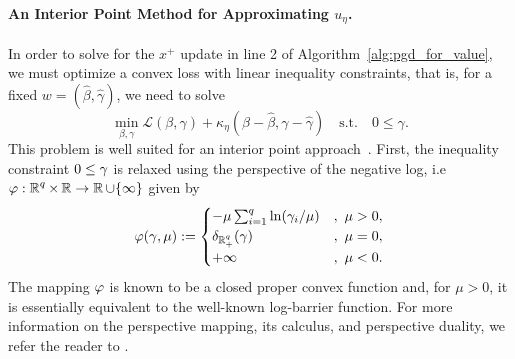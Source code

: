 
\paragraph{An Interior Point Method for Approximating $u_\eta$.}

In order to solve for the $x^+$ update in line 2 of Algorithm~\ref{alg:pgd_for_value}, we must optimize a convex loss with linear inequality constraints, that is, 
for a fixed $w = (\hat \beta, \hat \gamma)$, we need to solve 
\begin{equation}
\label{eq:ineqLoss}
\min_{\beta, \gamma} \mathcal{L}(\beta, \gamma) + \kappa_{\eta}(\beta - \hat \beta, \gamma - \hat \gamma) \quad \mbox{s.t.} \quad 0 \leq \gamma. 
\end{equation}
This problem is well suited for an interior point approach~\citep{Kojima1991,Nesterov1994,Wright1997,vanderbei99}. 
First, the inequality constraint $0\le\gamma$ is relaxed
using the perspective of the negative log, i.e %
$\varphi:\operatorname{\mathbb{R}}^q\times\operatorname{\mathbb{R}}\rightarrow \operatorname{\mathbb{R}}\cup\{\infty\}$ given by
\[
\varphi(\gamma,\mu):=
\begin{cases}
-\mu\sum_{i=1}^q\ln (\gamma_i/\mu)&,\ \mu>0,\\
\delta_{\operatorname{\mathbb{R}}^q_+}(\gamma)&,\ \mu=0,\\
+\infty&,\ \mu<0.
\end{cases}
\]
The mapping $\varphi$ is known to be a closed proper convex function and, 
for $\mu>0$, it is
essentially equivalent to the well-known log-barrier function.
For more information on the perspective mapping, its calculus,
and perspective duality, we refer the reader to \cite{ABDFM18,ABF13}.

